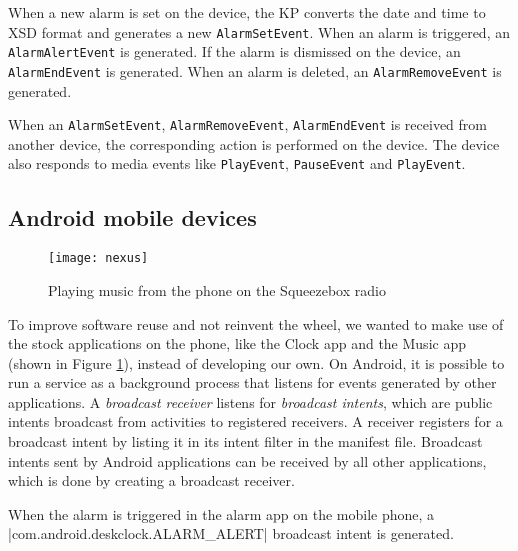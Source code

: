 When a new alarm is set on the device, the \ac{KP} converts the date and time to \ac{XSD} format and generates a new \texttt{AlarmSetEvent}. When an alarm is triggered, an \texttt{AlarmAlertEvent} is generated. If the alarm is dismissed on the device, an \texttt{AlarmEndEvent} is generated. When an alarm is deleted, an \texttt{AlarmRemoveEvent} is generated.

When an \texttt{AlarmSetEvent}, \texttt{AlarmRemoveEvent}, \texttt{AlarmEndEvent} is received from another device, the corresponding action is performed on the device. The device also responds to media events like \texttt{PlayEvent}, \texttt{PauseEvent} and \texttt{PlayEvent}.


\subsection{Android mobile devices}

\begin{figure}
\centering
\texttt{[image: nexus]}
\caption{Playing music from the phone on the Squeezebox radio}
\label{nexus}
\end{figure}

To improve software reuse and not reinvent the wheel, we wanted to make use of the stock applications on the phone, like the Clock app and the Music app (shown in Figure \ref{nexus}), instead of developing our own. On Android, it is possible to run a service as a background process that listens for events generated by other applications. A \emph{broadcast receiver} listens for \emph{broadcast intents}, which are public intents broadcast from activities to registered receivers. A receiver registers for a broadcast intent by listing it in its intent filter in the manifest file. Broadcast intents sent by Android applications can be received by all other applications, which is done by creating a broadcast receiver. 

When the alarm is triggered in the alarm app on the mobile phone, a |com.android.deskclock.ALARM_ALERT| broadcast intent is generated. 

